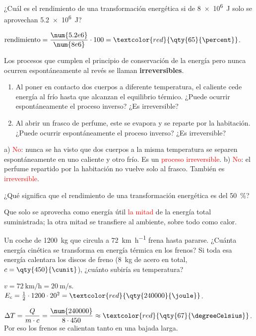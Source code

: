 \begin{exercise}
    ¿Cuál es el rendimiento de una transformación energética si de \qty{8e6}{\joule} solo se aprovechan \qty{5.2e6}{\joule}?
    \begin{solu}
        \(\text{rendimiento} = \dfrac{\num{5.2e6}}{\num{8e6}} \cdot 100 = \textcolor{red}{\qty{65}{\percent}}\).
    \end{solu}
\end{exercise}

\begin{exercise}
    Los procesos que cumplen el principio de conservación de la energía pero nunca ocurren espontáneamente al revés se llaman \textbf{irreversibles}.
    \begin{enumerate}[label=\alph*)]
        \item Al poner en contacto dos cuerpos a diferente temperatura, el caliente cede energía al frío hasta que alcanzan el equilibrio térmico. ¿Puede ocurrir espontáneamente el proceso inverso? ¿Es irreversible?
        \item Al abrir un frasco de perfume, este se evapora y se reparte por la habitación. ¿Puede ocurrir espontáneamente el proceso inverso? ¿Es irreversible?
    \end{enumerate}
    \begin{solu}
        a) \textcolor{red}{No}: nunca se ha visto que dos cuerpos a la misma temperatura se separen espontáneamente en uno caliente y otro frío. Es un \textcolor{red}{proceso irreversible}.
        b) \textcolor{red}{No}: el perfume repartido por la habitación no vuelve solo al frasco. También es \textcolor{red}{irreversible}.
    \end{solu}
\end{exercise}

\begin{exercise}
    ¿Qué significa que el rendimiento de una transformación energética es del \qty{50}{\percent}?
    \begin{solu}
        Que solo se aprovecha como energía útil \textcolor{red}{la mitad} de la energía total suministrada; la otra mitad se transfiere al ambiente, sobre todo como calor.
    \end{solu}
\end{exercise}

\begin{exercise}
    Un coche de \qty{1200}{\kg} que circula a \qty{72}{\km\per\hour} frena hasta pararse. ¿Cuánta energía cinética se transforma en energía térmica en los frenos? Si toda esa energía calentara los discos de freno (\qty{8}{\kg} de acero en total, \(c = \qty{450}{\cunit}\)), ¿cuánto subiría su temperatura?
    \begin{solu}
        \(v = \qty{72}{\km\per\hour} = \qty{20}{\m\per\s}\). \(E_c = \frac{1}{2} \cdot 1200 \cdot 20^2 = \textcolor{red}{\qty{240000}{\joule}}\).

        \(\Delta T = \dfrac{Q}{m \cdot c} = \dfrac{\num{240000}}{8 \cdot 450} \approx \textcolor{red}{\qty{67}{\degreeCelsius}}\). Por eso los frenos se calientan tanto en una bajada larga.
    \end{solu}
\end{exercise}

